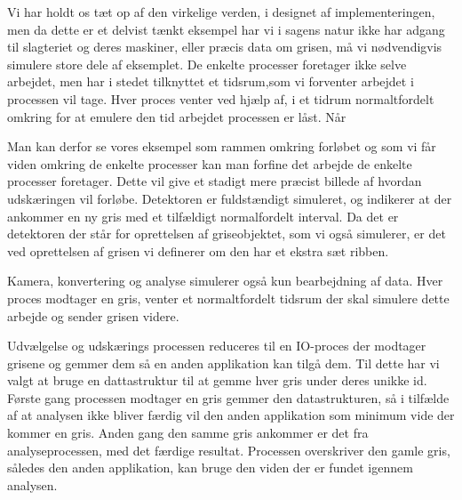 Vi har holdt os tæt op af den virkelige verden, i designet af implementeringen, men da dette er et delvist tænkt eksempel har vi i  sagens natur ikke har adgang til slagteriet og deres maskiner, eller præcis data om grisen, må vi nødvendigvis simulere store dele af eksemplet. 
De enkelte processer foretager ikke selve arbejdet, men har i stedet tilknyttet et tidsrum,som vi forventer arbejdet i processen vil tage. Hver proces venter ved hjælp af, i et tidrum normaltfordelt omkring for at emulere den tid arbejdet processen er låst. Når 

Man kan derfor se vores eksempel som rammen omkring forløbet og som vi får viden omkring de enkelte processer kan man forfine det arbejde de enkelte processer foretager. Dette vil   give et stadigt mere præcist billede af hvordan udskæringen vil forløbe. Detektoren er fuldstændigt simuleret, og indikerer at der ankommer en ny gris med et tilfældigt normalfordelt interval. Da det er detektoren der står for oprettelsen af griseobjektet, som vi også simulerer, er det ved oprettelsen af grisen vi definerer om den har et ekstra sæt ribben. 

Kamera, konvertering og analyse simulerer også kun bearbejdning af data. Hver proces modtager en gris, venter et normaltfordelt tidsrum der skal simulere dette arbejde og sender grisen videre. 

Udvælgelse og udskærings processen reduceres til en IO-proces der  modtager grisene og gemmer dem så en anden applikation kan tilgå dem. Til dette har vi valgt at bruge en  dattastruktur til at gemme  hver gris under deres unikke id. Første gang processen modtager en gris gemmer den datastrukturen, så i tilfælde af at analysen ikke bliver færdig vil den anden applikation som minimum vide der kommer en gris. Anden gang den samme gris ankommer er det fra analyseprocessen, med det færdige resultat. Processen overskriver den gamle gris, således den anden applikation, kan bruge den viden der er fundet igennem analysen.



